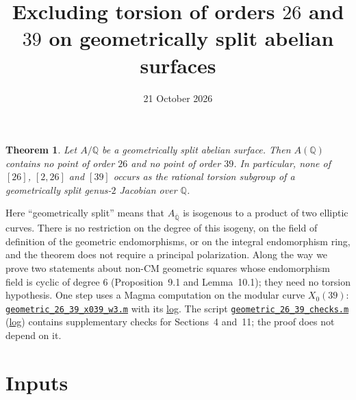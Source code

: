 \documentclass[11pt]{article}
\title{Excluding torsion of orders \(26\) and \(39\) on geometrically split abelian surfaces}
\author{}
\date{21 October 2026}
\newtheorem{theorem}{Theorem}
\newcommand{\Q}{\mathbb Q}
\begin{document}
\maketitle

\begin{theorem}\label{thm:main}
Let \(A/\Q\) be a geometrically split abelian surface. Then \(A(\Q)\)
contains no point of order \(26\) and no point of order \(39\).
In particular, none of
\href{https://genus-2-torsion.github.io/group.html?g=26}{\([26]\)},
\href{https://genus-2-torsion.github.io/group.html?g=2.26}{\([2,26]\)} and
\href{https://genus-2-torsion.github.io/group.html?g=39}{\([39]\)}
occurs as the rational torsion subgroup of a geometrically split
genus-\(2\) Jacobian over \(\Q\).
\end{theorem}

Here ``geometrically split'' means that \(A_{\overline{\Q}}\) is
isogenous to a product of two elliptic curves. There is no restriction
on the degree of this isogeny, on the field of definition of the
geometric endomorphisms, or on the integral endomorphism ring, and the
theorem does not require a principal polarization. Along the way we
prove two statements about non-CM geometric squares whose endomorphism
field is cyclic of degree \(6\) (Proposition~9.1 and Lemma~10.1); they
need no torsion hypothesis. One step uses a Magma computation on the
modular curve \(X_0(39)\):
\href{https://genus-2-torsion.github.io/data/knowledge/sources/geometric_26_39_x039_w3.m}{\texttt{geometric\_26\_39\_x039\_w3.m}}
with its
\href{https://genus-2-torsion.github.io/data/knowledge/sources/geometric_26_39_x039_w3.log}{log}.
The script
\href{https://genus-2-torsion.github.io/data/knowledge/sources/geometric_26_39_checks.m}{\texttt{geometric\_26\_39\_checks.m}}
(\href{https://genus-2-torsion.github.io/data/knowledge/sources/geometric_26_39_checks.log}{log})
contains supplementary checks for Sections~4 and~11; the proof does
not depend on it.

\section{Inputs}
\end{document}
